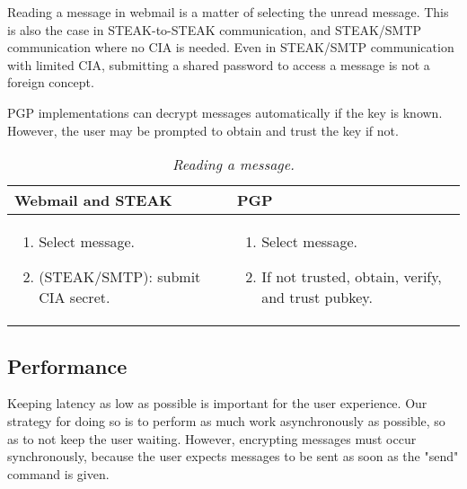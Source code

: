 Reading a message in webmail is a matter of selecting the unread message.  This is also the case in STEAK-to-STEAK communication, and STEAK/SMTP communication where no CIA is needed.  Even in STEAK/SMTP communication with limited CIA, submitting a shared password to access a message is not a foreign concept.

PGP implementations can decrypt messages automatically if the key is known.  However, the user may be prompted to obtain and trust the key if not.

\begin{table}[ht!]
\begin{tabular}{ | L{3.5cm} | L{3.5cm} |}
\hline
\textbf{Webmail and STEAK} & \textbf{PGP} \\
\hline
\vspace{-3mm}
\begin{enumerate}
  \item{Select message.}
  \item{(STEAK/SMTP): submit CIA secret.}
\end{enumerate}
\vspace{-3mm}
 &

\vspace{-3mm}
\begin{enumerate}
  \item{Select message.}
  \item{If not trusted, obtain, verify, and trust pubkey.}
\end{enumerate} 
\vspace{-\topsep} \\

\hline
\end{tabular}
\caption{\it Reading a message.}
\label{tab:account-creation}
\end{table}

\subsection{Performance}

Keeping latency as low as possible is important for the user experience.  Our strategy for doing so is to perform as much work asynchronously as possible, so as to not keep the user waiting.  However, encrypting messages must occur synchronously, because the user expects messages to be sent as soon as the "send" command is given.

